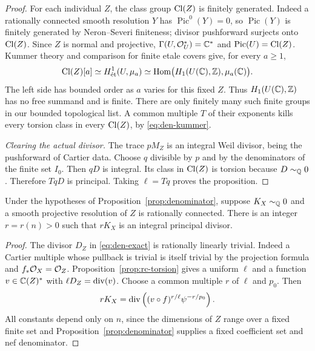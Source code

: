 \begin{proof}
For each individual $Z$, the class group $\operatorname{Cl}(Z)$ is finitely
generated.  Indeed a rationally connected smooth resolution $Y$
has $\operatorname{Pic}^0(Y)=0$, so $\operatorname{Pic}(Y)$ is
finitely generated by Neron--Severi finiteness; divisor pushforward
surjects onto $\operatorname{Cl}(Z)$.  Since $Z$ is normal and projective,
$\Gamma(U,\mathcal O_U^*)=\mathbb C^*$ and
$\operatorname{Pic}(U)=\operatorname{Cl}(Z)$.  Kummer theory and comparison
for finite etale covers \cite{SGA1} give, for every $a\geq1$,
\begin{equation}\label{eq:den-kummer}
 \operatorname{Cl}(Z)[a]\simeq H^1_{\mathrm{\acute et}}(U,\mu_a)
 \simeq\operatorname{Hom}\bigl(H_1(U(\mathbb C),\mathbb Z),\mu_a(\mathbb C)\bigr).
\end{equation}
The left side has bounded order as $a$ varies for this fixed $Z$.
Thus $H_1(U(\mathbb C),\mathbb Z)$ has no free summand and is finite.  There
are only finitely many such finite groups in our bounded topological
list.  A common multiple $T$ of their exponents kills every torsion
class in every $\operatorname{Cl}(Z)$, by \eqref{eq:den-kummer}.

\smallskip\noindent\textit{Clearing the actual divisor.}
The trace $pM_Z$ is an integral Weil divisor, being the pushforward
of Cartier data.  Choose $q$ divisible by $p$ and by the
denominators of the finite set $I_0$.  Then $qD$ is integral.
Its class in $\operatorname{Cl}(Z)$ is torsion because $D\sim_{\mathbb Q}0$.
Therefore $TqD$ is principal.  Taking $\ell=Tq$ proves the
proposition.
\end{proof}

\begin{corollary}\label{cor:relative-rc-torsion}
Under the hypotheses of Proposition~\ref{prop:denominator}, suppose
$K_X\sim_{\mathbb Q}0$ and a smooth projective resolution of $Z$ is
rationally connected.  There is an integer $r=r(n)>0$ such that
$rK_X$ is an integral principal divisor.
\end{corollary}

\begin{proof}
The divisor $D_Z$ in \eqref{eq:den-exact} is rationally linearly
trivial.  Indeed a Cartier multiple whose pullback is trivial is
itself trivial by the projection formula and
$f_*\mathcal O_X=\mathcal O_Z$.  Proposition~\ref{prop:rc-torsion} gives a
uniform $\ell$ and a function $v\in\mathbb C(Z)^*$ with
$\ell D_Z=\operatorname{div}(v)$.  Choose a common multiple $r$ of $\ell$
and $p_0$.  Then
\[
 rK_X=\operatorname{div}\left((v\circ f)^{r/\ell}\psi^{-r/p_0}\right).
\]
All constants depend only on $n$, since the dimensions of $Z$
range over a fixed finite set and Proposition~\ref{prop:denominator}
supplies a fixed coefficient set and nef denominator.
\end{proof}
